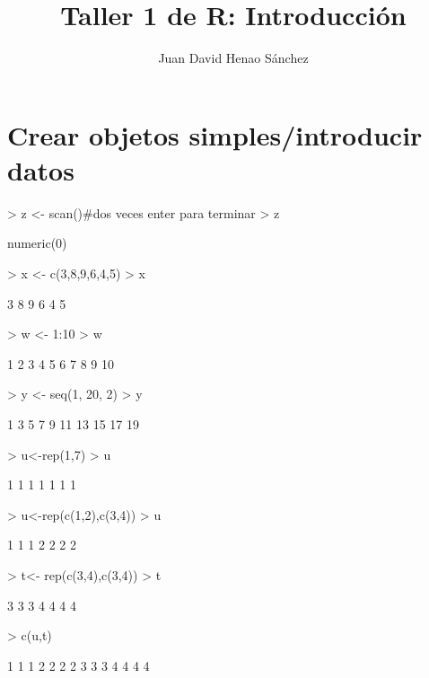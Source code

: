 \documentclass[12pt]{article}
\title{Taller 1 de R: Introducción}
\author{Juan David Henao Sánchez}
\begin{document}


\maketitle

 \section*{Crear objetos simples/introducir datos}
\begin{Schunk}
\begin{Sinput}
> z <- scan()#dos veces enter para terminar 
> z
\end{Sinput}
\begin{Soutput}
numeric(0)
\end{Soutput}
\begin{Sinput}
> x <- c(3,8,9,6,4,5) 
> x
\end{Sinput}
\begin{Soutput}
[1] 3 8 9 6 4 5
\end{Soutput}
\begin{Sinput}
> w <- 1:10 
> w
\end{Sinput}
\begin{Soutput}
 [1]  1  2  3  4  5  6  7  8  9 10
\end{Soutput}
\begin{Sinput}
> y <- seq(1, 20, 2) 
> y
\end{Sinput}
\begin{Soutput}
 [1]  1  3  5  7  9 11 13 15 17 19
\end{Soutput}
\begin{Sinput}
> u<-rep(1,7)
> u
\end{Sinput}
\begin{Soutput}
[1] 1 1 1 1 1 1 1
\end{Soutput}
\begin{Sinput}
> u<-rep(c(1,2),c(3,4))
> u
\end{Sinput}
\begin{Soutput}
[1] 1 1 1 2 2 2 2
\end{Soutput}
\begin{Sinput}
> t<- rep(c(3,4),c(3,4))
> t
\end{Sinput}
\begin{Soutput}
[1] 3 3 3 4 4 4 4
\end{Soutput}
\begin{Sinput}
> c(u,t)
\end{Sinput}
\begin{Soutput}
 [1] 1 1 1 2 2 2 2 3 3 3 4 4 4 4

\end{Soutput}
\end{Schunk}
\end{document}
